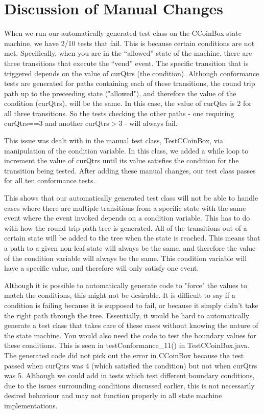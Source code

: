 \documentclass[11pt, a4paper]{article}
\begin{document}
\section{Discussion of Manual Changes}
When we run our automatically generated test class on the CCoinBox state machine, we have 2/10 tests that fail. This is because certain conditions are not met. Specifically, when you are in the “allowed” state of the machine, there are three transitions that execute the “vend” event. The specific transition that is triggered depends on the value of curQtrs (the condition). Although conformance tests are generated for paths containing each of these transitions, the round trip path up to the preceeding state ("allowed"), and therefore the value of the condition (curQtrs), will be the same. In this case, the value of curQtrs is 2 for all three transitions. So the tests checking the other paths - one requiring curQtrs==3 and another curQtrs$>$3 - will always fail. 

This issue was dealt with in the manual test class, TestCCoinBox, via manipulation of the condition variable. In this class, we added a while loop to increment the value of curQtrs until its value satisfies the condition for the transition being tested. After adding these manual changes, our test class passes for all ten conformance tests.

This shows that our automatically generated test class will not be able to handle cases where there are multiple transitions from a specific state with the same event where the event invoked depends on a condition variable. This has to do with how the round trip path tree is generated. All of the transitions out of a certain state will be added to the tree when the state is reached. This means that a path to a given non-leaf state will always be the same, and therefore the value of the condition variable will always be the same. This condition variable will have a specific value, and therefore will only satisfy one event. 

Although it is possible to automatically generate code to "force" the values to match the conditions, this might not be desirable. It is difficult to say if a condition is failing because it is supposed to fail, or because it simply didn't take the right path through the tree. Essentially, it would be hard to automatically generate a test class that takes care of these cases without knowing the nature of the state machine. You would also need the code to test the boundary values for these conditions. This is seen in testConformance\_11() in TestCCoinBox.java. The generated code did not pick out the error in CCoinBox because the test passed when curQtrs was 4 (which satisfied the condition) but not when curQtrs was 5. Although we could add in tests which test different boundary conditions, due to the issues surrounding conditions discussed earlier, this is not necessarily desired behaviour and may not function properly in all state machine implementations.
\end{document}
